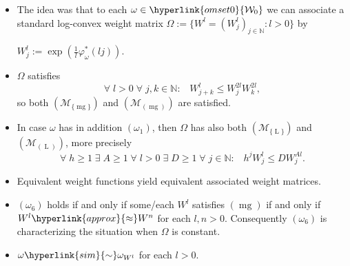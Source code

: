 \documentclass[10pt]{amsart}%
\numberwithin{equation}{section}
\theoremstyle{plain}
\newcommand{\NN}{\mathbb{N}}
\let\on=\operatorname
\begin{document}
\begin{itemize}
\item[$(i)$] The idea was that to each $\omega\in\hyperlink{omset0}{\mathcal{W}_0}$ we can associate a standard log-convex weight matrix $\Omega:=\{W^l=(W^l_j)_{j\in\NN}: l>0\}$ by\vspace{6pt}

    \centerline{$W^l_j:=\exp\left(\frac{1}{l}\varphi^{*}_{\omega}(lj)\right)$.}\vspace{6pt}


\item[$(ii)$] $\Omega$ satisfies
    \begin{equation}\label{newmoderategrowth}
    \forall\;l>0\;\forall\;j,k\in\NN:\;\;\;W^l_{j+k}\le W^{2l}_jW^{2l}_k,
    \end{equation}
    so both \hyperlink{R-mg}{$(\mathcal{M}_{\{\on{mg}\}})$} and \hyperlink{B-mg}{$(\mathcal{M}_{(\on{mg})})$} are satisfied.

\item[$(iii)$] In case $\omega$ has in addition \hyperlink{om1}{$(\omega_1)$}, then $\Omega$ has also both \hyperlink{R-L}{$(\mathcal{M}_{\{\on{L}\}})$} and \hyperlink{B-L}{$(\mathcal{M}_{(\on{L})})$}, more precisely
     \begin{equation}\label{newexpabsorb}
     \forall\;h\ge 1\;\exists\;A\ge 1\;\forall\;l>0\;\exists\;D\ge 1\;\forall\;j\in\NN:\;\;\;h^jW^l_j\le D W^{Al}_j.
     \end{equation}

\item[$(iv)$] Equivalent weight functions yield equivalent associated weight matrices.


\item[$(v)$] \hyperlink{om6}{$(\omega_6)$} holds if and only if some/each $W^l$ satisfies \hyperlink{mg}{$(\on{mg})$} if and only if $W^l\hyperlink{approx}{\approx}W^n$ for each $l,n>0$. Consequently \hyperlink{om6}{$(\omega_6)$} is characterizing the situation when $\Omega$ is constant.

\item[$(vi)$] $\omega\hyperlink{sim}{\sim}\omega_{W^l}$ for each $l>0$.
\end{itemize}
\end{document}
